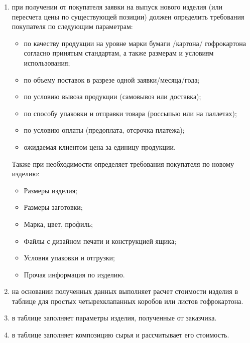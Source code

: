 \begin{enumerate}
\item 	\manager при получении от покупателя заявки на выпуск нового изделия (или пересчета цены по существующей позиции) должен определить требования покупателя по следующим параметрам:
\begin{itemize}
    \item  по качеству продукции на уровне марки бумаги /картона/ гофрокартона согласно принятым стандартам, а также размерам и условиям использования;
\item по объему поставок в разрезе одной заявки/месяца/года;
\item по условию вывоза продукции (самовывоз или доставка);
\item по способу упаковки и отправки товара (россыпью или на паллетах);
\item по условию оплаты (предоплата, отсрочка платежа);
\item ожидаемая клиентом цена за единицу продукции.
\end{itemize}

Также при необходимости \manager определяет требования покупателя по новому изделию:
\begin{itemize}
\item	Размеры изделия;
\item	Размеры заготовки;
\item	Марка, цвет, профиль;
\item	Файлы с дизайном печати и конструкцией ящика;
\item	Условия упаковки и отгрузки;
\item	Прочая информация по изделию.
\end{itemize}

\item	\manager на основании полученных данных выполняет расчет стоимости изделия в таблице  
 для простых 
 четырехклапанных коробов или листов гофрокартона. 
\item	\manager в таблице  заполняет параметры изделия, полученные от заказчика.
\item	\manager в таблице   заполняет композицию сырья и рассчитывает его стоимость.



\end{enumerate}
